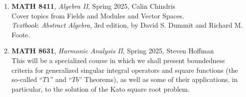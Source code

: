 \documentclass{article}
\begin{document}
\begin{enumerate}[leftmargin=*]
    \item[] \textbf{MATH 8411}, \textit{Algebra II}, Spring 2025, Calin Chindris\\
    Cover topics from Fields and Modules and Vector Spaces. \\
    \textit{Textbook}: \textit{Abstract Algebra}, 3rd edition, by David S. Dummit and Richard M. Foote.

    \item[] \textbf{MATH 8631}, \textit{Harmonic Analysis II}, Spring 2025, Steven Hoffman\\
    This will be a specialized course in which we shall present boundedness criteria for generalized singular integral operators and square functions (the so-called ``$T1$'' and ``$Tb$'' Theorems), as well as some of their applications, in particular, to the solution of the Kato square root problem. 
\end{enumerate}
\end{document}
